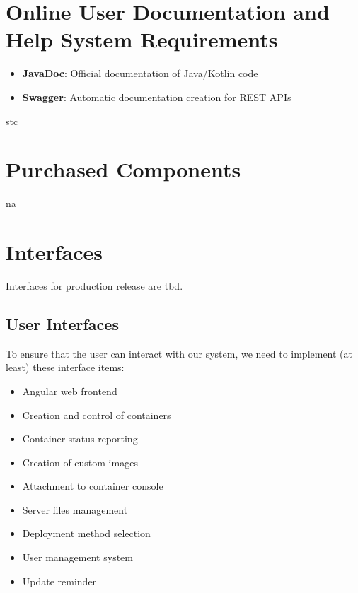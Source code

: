 \documentclass[a4paper,12pt,chapterprefix=false,bibliography=totoc,listof=totoc,]{scrreprt}
\begin{document}
\section{Online User Documentation and Help System Requirements}
\begin{itemize}
	\item \textbf{JavaDoc}: Official documentation of Java/Kotlin code
	\item \textbf{Swagger}: Automatic documentation creation for REST APIs
\end{itemize}

\gls{stc}

\section{Purchased Components}
\gls{na}

\section{Interfaces}
Interfaces for production release are \gls{tbd}.

\subsection{User Interfaces}
To ensure that the user can interact with our system, we need to implement (at least) these interface items:
\begin{itemize}
	\item Angular web frontend
	\item Creation and control of containers
	\item Container status reporting
	\item Creation of custom images
	\item Attachment to container console
	\item Server files management
	\item Deployment method selection
	\item User management system
	\item Update reminder
\end{itemize}
\end{document}
